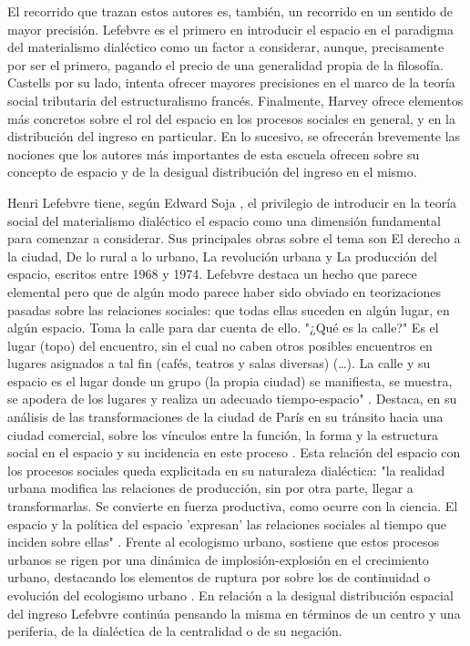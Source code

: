 El recorrido que trazan estos autores es, también, un recorrido en un sentido de mayor precisión. Lefebvre es el primero en introducir el espacio en el paradigma del materialismo dialéctico \cite{soja} como un factor a considerar, aunque, precisamente por ser el primero, pagando el precio de una generalidad propia de la filosofía. Castells por su lado, intenta ofrecer mayores precisiones en el marco de la teoría social tributaria del estructuralismo francés. Finalmente, Harvey ofrece elementos más concretos sobre el rol del espacio en los procesos sociales en general, y en la distribución del ingreso en particular. En lo sucesivo, se ofrecerán brevemente las nociones que los autores más importantes de esta escuela ofrecen sobre su concepto de espacio y de la desigual distribución del ingreso en el mismo. 

Henri Lefebvre tiene, según Edward Soja \citeyear{soja}, el privilegio de introducir en la teoría social del materialismo dialéctico el espacio como una dimensión fundamental para comenzar a considerar. Sus principales obras sobre el tema son El derecho a la ciudad, De lo rural a lo urbano, La revolución urbana y La producción del espacio, escritos entre 1968 y 1974. Lefebvre destaca un hecho que parece elemental pero que de algún modo parece haber sido obviado en teorizaciones pasadas sobre las relaciones sociales: que todas ellas suceden en algún lugar, en algún espacio. Toma la calle para dar cuenta de ello. "¿Qué es la calle?" Es el lugar (topo) del encuentro, sin el cual no caben otros posibles encuentros en lugares asignados a tal fin (cafés, teatros y salas diversas) (…). La calle y su espacio es el lugar donde un grupo (la propia ciudad) se manifiesta, se muestra, se apodera de los lugares y realiza un adecuado tiempo-espacio" \cite[p.~25]{lefebvre}. Destaca, en su análisis de las transformaciones de la ciudad de París en su tránsito hacia una ciudad comercial, sobre los vínculos entre la función, la forma y la estructura social en el espacio y su incidencia en este proceso \cite[p.~17]{lefebvre}. Esta relación del espacio con los procesos sociales queda explicitada en su naturaleza dialéctica: "la realidad urbana modifica las relaciones de producción, sin por otra parte, llegar a transformarlas. Se convierte en fuerza productiva, como ocurre con la ciencia. El espacio y la política del espacio 'expresan' las relaciones sociales al tiempo que inciden sobre ellas" \cite[p.~21]{lefebvre}. Frente al ecologismo urbano, sostiene que estos procesos urbanos se rigen por una dinámica de implosión-explosión en el crecimiento urbano, destacando los elementos de ruptura por sobre los de continuidad o evolución del ecologismo urbano \cite[p.~20]{lefebvre}. En relación a la desigual distribución espacial del ingreso Lefebvre continúa pensando la misma en términos de un centro y una periferia, de la dialéctica de la centralidad o de su negación.

